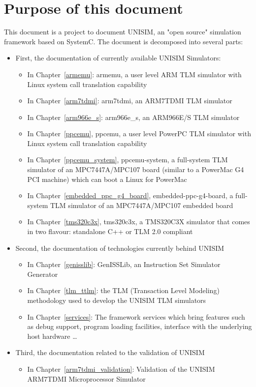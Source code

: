 \section{Purpose of this document}

This document is a project to document UNISIM, an "open source" simulation framework based on SystemC.
The document is decomposed into several parts:
\begin{itemize}
	\item First, the documentation of currently available UNISIM Simulators:
	\begin{itemize}
		\item In Chapter~\ref{armemu}: armemu, a user level ARM TLM simulator with Linux system call translation capability
		\item In Chapter~\ref{arm7tdmi}: arm7tdmi, an ARM7TDMI TLM simulator
		\item In Chapter~\ref{arm966e_s}: arm966e\_s, an ARM966E/S TLM simulator
		\item In Chapter~\ref{ppcemu}, ppcemu, a user level PowerPC TLM simulator with Linux system call translation capability
		\item In Chapter~\ref{ppcemu_system}, ppcemu-system, a full-system TLM simulator of an MPC7447A/MPC107 board (similar to a PowerMac G4 PCI machine) which can boot a Linux for PowerMac
		\item In Chapter~\ref{embedded_ppc_g4_board}, embedded-ppc-g4-board, a full-system TLM simulator of an MPC7447A/MPC107 embedded board
		\item In Chapter~\ref{tms320c3x}, tms320c3x, a TMS320C3X simulator that comes in two flavour: standalone C++ or TLM 2.0 compliant
	\end{itemize}
	\item Second, the documentation of technologies currently behind UNISIM
	\begin{itemize}
		\item In Chapter~\ref{genisslib}: GenISSLib, an Instruction Set Simulator Generator
		\item In Chapter~\ref{tlm_ttlm}: the TLM (Transaction Level Modeling) methodology used to develop the UNISIM TLM simulators
		\item In Chapter~\ref{services}: The framework services which bring features such as debug support, program loading facilities, interface with the underlying host hardware \ldots
	\end{itemize}
	\item Third, the documentation related to the validation of UNISIM
	\begin{itemize}
		\item In Chapter~\ref{arm7tdmi_validation}: Validation of the UNISIM ARM7TDMI Microprocessor Simulator
	\end{itemize}
\end{itemize}

